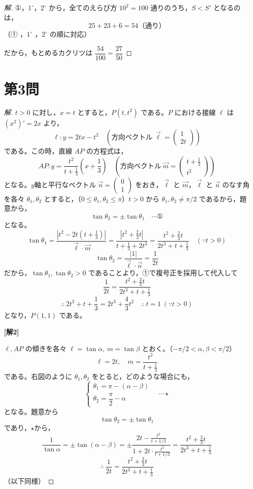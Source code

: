 \documentclass[../main.tex]{subfiles}
\begin{document}
\begin{proof}[解]
  ①，$1^\circ$，$2^\circ$ から，全てのえらび方 $10^2=100$ 通りのうち，$S<S'$ となるのは，
  \[
    25+23+6=54 \text{（通り）}
  \]
  （① ，$1^\circ$ ，$2^\circ$ の順に対応）

  だから，もとめるカクリツは $\dfrac{54}{100}=\dfrac{27}{50}$
\end{proof}

\newpage

\section*{第3問}

\begin{proof}[解]
  $t>0$ に対し，$x=t$ とすると，$P(t,t^2)$ である。$P$ における接線 $\ell$ は $(x^2)'=2x$ より，
  \[
    \ell: y=2tx-t^2 \quad \left(\text{方向ベクトル}\ \vec\ell=
      \begin{pmatrix}1\\2t
    \end{pmatrix}\right)
  \]
  である。この時，直線 $AP$ の方程式は，
  \[
    AP: y=\frac{t^2}{t+\frac13}\left(x+\frac13\right) \quad \left(\text{方向ベクトル}\ \vec{m}=
      \begin{pmatrix}t+\frac13\\t^2
    \end{pmatrix}\right)
  \]
  となる。$y$軸と平行なベクトル $\vec n=
  \begin{pmatrix}0\\1
  \end{pmatrix}$ をおき，$\vec\ell$ と $\vec m$，$\vec\ell$ と $\vec n$ のなす角を各々 $\theta_1,\theta_2$ とすると，（$0\le\theta_1,\theta_2\le\pi$）$t>0$ から $\theta_1,\theta_2\ne\pi/2$ であるから，題意から，
  \[
    \tan\theta_2=\pm\tan\theta_1 \quad \cdots \text{①}
  \]
  となる。
  \[
    \tan\theta_1=\frac{|t^2-2t(t+\frac13)|}{\vec\ell\cdot\vec m}=\frac{|t^2+\frac23t|}{t+\frac13+2t^3}=\frac{t^2+\frac23t}{2t^3+t+\frac13} \quad (\because t>0)
  \]
  \[
    \tan\theta_2=\frac{|1|}{\vec\ell\cdot\vec n}=\frac{1}{2t}
  \]
  だから，$\tan\theta_1,\tan\theta_2>0$ であることより，①で複号正を採用して代入して
  \[
    \frac{1}{2t}=\frac{t^2+\frac23t}{2t^3+t+\frac13}
  \]
  \[
    \therefore\ 2t^3+t+\frac13=2t^3+\frac43t^2 \quad\therefore\ t=1\ (\because t>0)
  \]
  となり，$P(1,1)$ である。

  \medskip
  \noindent\textbf{[解2]}

  $\ell,AP$ の傾きを各々 $\ell=\tan\alpha,\ m=\tan\beta$ とおく。（$-\pi/2<\alpha,\beta<\pi/2$）
  \[
    \ell=2t,\quad m=\frac{t^2}{t+\frac13}
  \]
  である。右図のように $\theta_1,\theta_2$ をとると，どのような場合にも，
  \[
    \begin{cases}
      \theta_1=\pi-(\alpha-\beta) \\
      \theta_2=\dfrac{\pi}{2}-\alpha
    \end{cases}
    \quad \cdots \star
  \]
  となる。題意から
  \[
    \tan\theta_2=\pm\tan\theta_1
  \]
  であり，$\star$から，
  \[
    \frac{1}{\tan\alpha}=\pm\tan(\alpha-\beta)=\pm\frac{2t-\frac{t^2}{t+1/3}}{1+2t\cdot\frac{t^2}{t+1/3}}=\frac{t^2+\frac23t}{2t^3+t+\frac13}
  \]
  \[
    \therefore\ \frac{1}{2t}=\frac{t^2+\frac23t}{2t^3+t+\frac13}
  \]
  （以下同様）
\end{proof}
\end{document}
